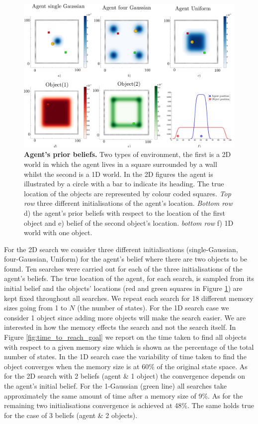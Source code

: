 \begin{figure}
  \includegraphics[width=\textwidth]{./ch5-MLMF/Figures/Figure14.pdf}
  \caption{\textbf{Agent's prior beliefs.} Two types of environment, the first is 
  a 2D world in which the agent lives in a square surrounded by a wall whilst the second is a 1D
  world. In the 2D figures the agent is illustrated by a circle with a bar to indicate its heading. The true location 
  of the objects are represented by colour coded squares. \textit{Top row} three different initialisations of the agent's location. 
  \textit{Bottom row} d) the agent's prior beliefs with respect to the location of the first object and e) belief of the second object's location.
  \textit{bottom row} f) 1D world with one object.}
  \label{fig:exploration_init}
\end{figure}

For the 2D search we consider three different initialisations (single-Gaussian, four-Gaussian, Uniform) for the agent's belief where there are 
two objects to be found. Ten searches were carried out for each of the three initialisations of the agent's beliefs. 
The true location of the agent, for each search, is sampled from its initial belief and the objects' locations 
(red and green squares in Figure \ref{fig:exploration_init}) are kept fixed throughout all searches. We repeat each search for 18 different memory 
sizes going from 1 to $N$ (the number of states). For the 1D search case we consider 1 object since adding more objects will make the search easier. 
We are interested in how the memory effects the search and not the search itself. In Figure \ref{fig:time_to_reach_goal} we report on the time taken to 
find all objects with respect to a given memory size which is shown as the percentage of the total number of states. 
In the 1D search case the variability of time taken to find the object converges when the memory size is at 60\% of the original state space. 
As for the 2D search with 2 beliefs (agent \& 1 object) the convergence depends on the agent's initial belief. For the 1-Gaussian (green line) 
all searches take approximately the same amount of time after a memory size of 9\%. As for the remaining two initialisations convergence is achieved at  48\%. 
The same holds true for the case of 3 beliefs (agent \& 2 objects).

